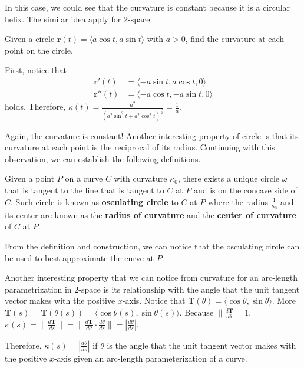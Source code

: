 \documentclass[../../../main.tex]{subfiles}
\begin{document}
In this case, we could see that the curvature is constant because it
is a circular helix. The similar idea apply for 2-space.

\begin{problem}{}{}
Given a circle $\mathbf{r}(t) = \langle a \cos t, a \sin t \rangle$
with $a > 0$, find the curvature at each point on the circle.
\end{problem}
\begin{solution}
First, notice that
\begin{align*}
    \mathbf{r}'(t) &= \langle -a \sin t, a \cos t, 0 \rangle \\
    \mathbf{r}''(t) &= \langle -a \cos t, -a \sin t, 0 \rangle
\end{align*}
holds. Therefore, $\kappa(t) = \frac{a^2}{(a^2 \sin^2 t +
a^2 \cos^2 t)^\frac{3}{2}} = \frac{1}{a}$.
\end{solution}

Again, the curvature is constant! Another interesting property of
circle is that its curvature at each point is the reciprocal of its
radius. Continuing with this observation, we can establish the
following definitions.

\begin{definition}{}{}
Given a point $P$ on a curve $C$ with curvature $\kappa_0$,
there exists a unique circle $\omega$ that is tangent to the line
that is tangent to $C$ at $P$ and is on the concave side of $C$.
Such circle is known as \textbf{osculating circle} to $C$ at $P$
where the radius $\frac{1}{\kappa_0}$ and its center are known as
the \textbf{radius of curvature} and the \textbf{center of curvature}
of $C$ at $P$.
\end{definition}

From the definition and construction, we can notice that the
osculating circle can be used to best approximate the curve at $P$.

Another interesting property that we can notice from curvature for an
arc-length parametrization in 2-space is its relationship with the
angle that the unit tangent vector makes with the positive $x$-axis.
Notice that $\mathbf{T}(\theta) = \langle \cos\theta, \sin\theta
\rangle$. More $\mathbf{T}(s) = \mathbf{T}(\theta(s)) = \langle
\cos\theta(s), \sin\theta(s) \rangle$. Because $\| \frac{d\mathbf{T}}
{d\theta} = 1$, $\kappa(s) = \| \frac{d\mathbf{T}}{ds} \| =
\| \frac{d\mathbf{T}}{d\theta} \cdot \frac{d\theta}{ds} \| =
| \frac{d\theta}{ds} |$.

\begin{important}
Therefore, $\kappa(s) = | \frac{d\theta}{ds} |$ if $\theta$ is the
angle that the unit tangent vector makes with the positive $x$-axis
given an arc-length parameterization of a curve.
\end{important}
\end{document}
